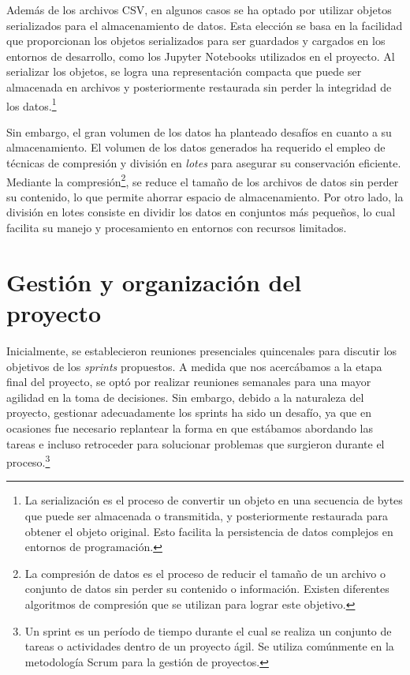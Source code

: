 Además de los archivos CSV, en algunos casos se ha optado por utilizar objetos serializados para el 
almacenamiento de datos. Esta elección se basa en la facilidad que proporcionan los objetos serializados 
para ser guardados y cargados en los entornos de desarrollo, como los Jupyter Notebooks utilizados 
en el proyecto. Al serializar los objetos, se logra una representación compacta que puede ser 
almacenada en archivos y posteriormente restaurada sin perder la integridad de los 
datos.\footnote{La serialización es el proceso de convertir un objeto en una secuencia de 
bytes que puede ser almacenada o transmitida, y posteriormente restaurada para obtener el 
objeto original. Esto facilita la persistencia de datos complejos en entornos de programación.}

Sin embargo, el gran volumen de los datos ha planteado desafíos en cuanto a su almacenamiento. 
El volumen de los datos generados ha requerido el empleo de técnicas de compresión y división 
en \textit{lotes} para asegurar su conservación eficiente. Mediante la compresión\footnote{La compresión 
de datos es el proceso de reducir el tamaño de un 
archivo o conjunto de datos sin perder su contenido o información. Existen diferentes 
algoritmos de compresión que se utilizan para lograr este objetivo.}, se reduce el tamaño 
de los archivos de datos sin perder su contenido, lo que permite ahorrar espacio de 
almacenamiento. Por otro lado, la división 
en lotes consiste en dividir los datos en conjuntos más pequeños, lo cual facilita su manejo y 
procesamiento en entornos con recursos limitados.

\section{Gestión y organización del proyecto}

Inicialmente, se establecieron reuniones presenciales quincenales para discutir los objetivos de 
los \textit{sprints} propuestos. A medida que nos acercábamos a la etapa final del proyecto, se optó por 
realizar reuniones semanales para una mayor agilidad en la toma de decisiones. Sin embargo, debido 
a la naturaleza del proyecto, gestionar adecuadamente los sprints ha sido un desafío, ya que en 
ocasiones fue necesario replantear la forma en que estábamos abordando las tareas e incluso 
retroceder para solucionar problemas que surgieron durante el proceso.\footnote{Un sprint es un 
período de tiempo durante el cual se realiza un conjunto de tareas o actividades dentro de un 
proyecto ágil. Se utiliza comúnmente en la metodología Scrum para la gestión de proyectos.}


